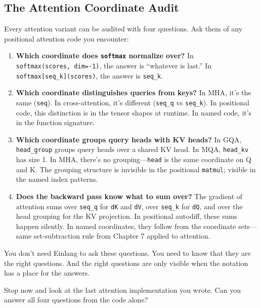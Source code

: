 \documentclass[11pt,titlepage]{article}
\providecommand{\tightlist}{%
  \setlength{\itemsep}{0pt}\setlength{\parskip}{0pt}}
\begin{document}
\vspace{2em}

\vspace{2em}

\hypertarget{the-attention-coordinate-audit}{%
\subsection{The Attention Coordinate
Audit}\label{the-attention-coordinate-audit}}

Every attention variant can be audited with four questions. Ask them of
any positional attention code you encounter:

\begin{enumerate}
\def\labelenumi{\arabic{enumi}.}
\tightlist
\item
  \textbf{Which coordinate does \texttt{softmax} normalize over?} In
  \texttt{softmax(scores,\ dim=-1)}, the answer is ``whatever is last.''
  In \texttt{softmax{[}seq\_k{]}(scores)}, the answer is
  \texttt{seq\_k}.
\item
  \textbf{Which coordinate distinguishes queries from keys?} In MHA,
  it's the same (\texttt{seq}). In cross-attention, it's different
  (\texttt{seq\_q} vs \texttt{seq\_k}). In positional code, this
  distinction is in the tensor shapes at runtime. In named code, it's in
  the function signature.
\item
  \textbf{Which coordinate groups query heads with KV heads?} In GQA,
  \texttt{head\_group} groups query heads over a shared KV head. In MQA,
  \texttt{head\_kv} has size 1. In MHA, there's no
  grouping---\texttt{head} is the same coordinate on Q and K. The
  grouping structure is invisible in the positional \texttt{matmul};
  visible in the named index patterns.
\item
  \textbf{Does the backward pass know what to sum over?} The gradient of
  attention sums over \texttt{seq\_q} for \texttt{dK} and \texttt{dV},
  over \texttt{seq\_k} for \texttt{dQ}, and over the head grouping for
  the KV projection. In positional autodiff, these sums happen silently.
  In named coordinates, they follow from the coordinate sets---same
  set-subtraction rule from Chapter 7 applied to attention.
\end{enumerate}

You don't need Einlang to ask these questions. You need to know that
they are the right questions. And the right questions are only visible
when the notation has a place for the answers.

Stop now and look at the last attention implementation you wrote. Can
you answer all four questions from the code alone?
\end{document}
